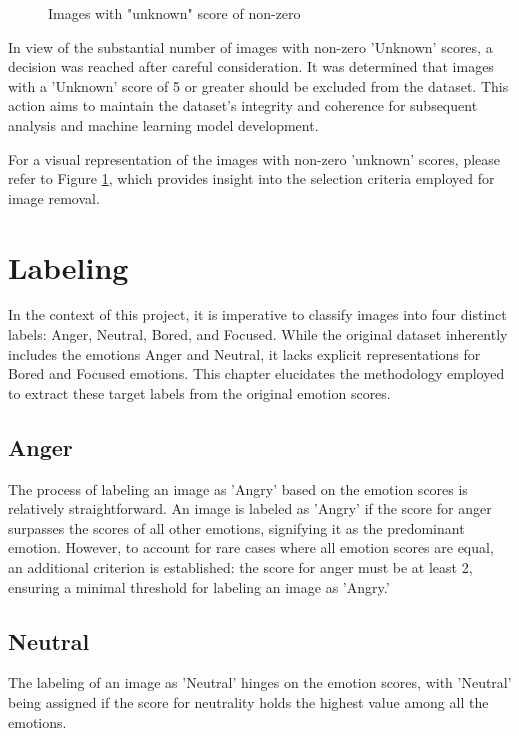 \documentclass[]{report}
\begin{document}
\begin{figure}[h]
	\centering
	\subfloat[Images with unknown=6]{{ }}
	\qquad
	\subfloat[Images with unknown=5]{{ }}
	\caption{Images with "unknown" score of non-zero}
	\label{fig:uk}
\end{figure}

In view of the substantial number of images with non-zero 'Unknown' scores, a decision was reached after careful consideration. It was determined that images with a 'Unknown' score of 5 or greater should be excluded from the dataset. This action aims to maintain the dataset's integrity and coherence for subsequent analysis and machine learning model development.

For a visual representation of the images with non-zero 'unknown' scores, please refer to Figure \ref{fig:uk}, which provides insight into the selection criteria employed for image removal.



\chapter{Labeling}

In the context of this project, it is imperative to classify images into four distinct labels: Anger, Neutral, Bored, and Focused. While the original dataset inherently includes the emotions Anger and Neutral, it lacks explicit representations for Bored and Focused emotions. This chapter elucidates the methodology employed to extract these target labels from the original emotion scores.

\section{Anger}
The process of labeling an image as 'Angry' based on the emotion scores is relatively straightforward. An image is labeled as 'Angry' if the score for anger surpasses the scores of all other emotions, signifying it as the predominant emotion. However, to account for rare cases where all emotion scores are equal, an additional criterion is established: the score for anger must be at least 2, ensuring a minimal threshold for labeling an image as 'Angry.'

\section{Neutral}
The labeling of an image as 'Neutral' hinges on the emotion scores, with 'Neutral' being assigned if the score for neutrality holds the highest value among all the emotions.
\end{document}
